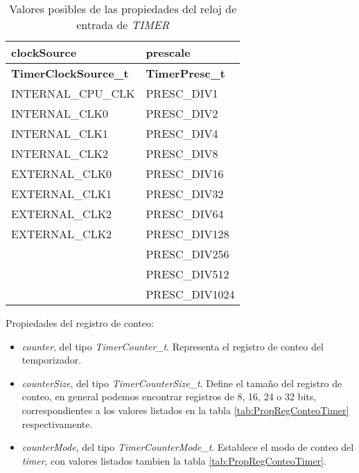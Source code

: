 \begin{table}[h]
	\centering	
	\begin{tabular}{l l}   
		\toprule
		\textbf{clockSource} & \textbf{prescale} \\
		\midrule
		\textbf{TimerClockSource\_t} & \textbf{TimerPresc\_t} \\
		\midrule
      INTERNAL\_CPU\_CLK & PRESC\_DIV1 \\
      INTERNAL\_CLK0     & PRESC\_DIV2 \\
      INTERNAL\_CLK1     & PRESC\_DIV4 \\
      INTERNAL\_CLK2     & PRESC\_DIV8 \\
      EXTERNAL\_CLK0     & PRESC\_DIV16 \\
      EXTERNAL\_CLK1     & PRESC\_DIV32 \\
      EXTERNAL\_CLK2     & PRESC\_DIV64 \\
      EXTERNAL\_CLK2     & PRESC\_DIV128 \\
                         & PRESC\_DIV256 \\
                         & PRESC\_DIV512 \\
                         & PRESC\_DIV1024 \\
		\bottomrule
		\hline
	\end{tabular}
	\caption[Valores posibles de las propiedades del reloj de entrada de \emph{TIMER}]{Valores posibles de las propiedades del reloj de entrada de \emph{TIMER}}
	\label{tab:timerInputClock}
\end{table}

Propiedades del registro de conteo:

\begin{itemize}
\item
\emph{counter}, del tipo \emph{TimerCounter\_t}. Representa el registro de conteo del temporizador.
\item
\emph{counterSize}, del tipo \emph{TimerCounterSize\_t}. Define el tamaño del registro de conteo, en general podemos encontrar registros de 8, 16, 24 o 32 bits, correspondientes a los valores listados en la tabla \ref{tab:PropRegConteoTimer} respectivamente.
\item
\emph{counterMode}, del tipo \emph{TimerCounterMode\_t}. Establece el modo de conteo del \emph{timer}, con valores listados tambien la tabla \ref{tab:PropRegConteoTimer}.
\end{itemize}

